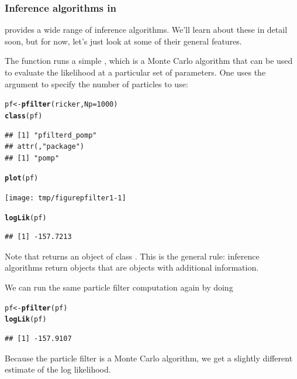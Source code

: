 \documentclass{beamer}\usepackage[]{graphicx}\usepackage[]{color}
\makeatletter
\newcommand{\hlnum}[1]{\textcolor[rgb]{0.686,0.059,0.569}{#1}}%
\newcommand{\hlstd}[1]{\textcolor[rgb]{0.345,0.345,0.345}{#1}}%
\newcommand{\hlkwb}[1]{\textcolor[rgb]{0.69,0.353,0.396}{#1}}%
\newcommand{\hlkwc}[1]{\textcolor[rgb]{0.333,0.667,0.333}{#1}}%
\newcommand{\hlkwd}[1]{\textcolor[rgb]{0.737,0.353,0.396}{\textbf{#1}}}%
\newenvironment{kframe}{%
 \def\at@end@of@kframe{}%
 \ifinner\ifhmode%
  \def\at@end@of@kframe{\end{minipage}}%
  \begin{minipage}{\columnwidth}%
 \fi\fi%
 \def\FrameCommand##1{\hskip\@totalleftmargin \hskip-\fboxsep
 \colorbox{shadecolor}{##1}\hskip-\fboxsep
     \hskip-\linewidth \hskip-\@totalleftmargin \hskip\columnwidth}%
 \MakeFramed {\advance\hsize-\width
   \@totalleftmargin\z@ \linewidth\hsize
   \@setminipage}}%
 {\par\unskip\endMakeFramed%
 \at@end@of@kframe}
\newenvironment{knitrout}{}{} %
\makeatother
\begin{document}
\begin{frame}[fragile] 

\frametitle{Inference algorithms in }

\bi
\item {} provides a wide range of inference algorithms.
We'll learn about these in detail soon, but for now, let's just look at some of their general features.

\item The  function runs a simple , which is a Monte Carlo algorithm that can be used to evaluate the likelihood at a particular set of parameters.
One uses the  argument to specify the number of particles to use:
\ei
\begin{knitrout}\small
{}\color{fgcolor}\begin{kframe}
\begin{alltt}
\hlstd{pf} \hlkwb{<-} \hlkwd{pfilter}\hlstd{(ricker,}\hlkwc{Np}\hlstd{=}\hlnum{1000}\hlstd{)}
\hlkwd{class}\hlstd{(pf)}
\end{alltt}
\begin{verbatim}
## [1] "pfilterd_pomp"
## attr(,"package")
## [1] "pomp"
\end{verbatim}
\begin{alltt}
\hlkwd{plot}\hlstd{(pf)}
\end{alltt}
\end{kframe}

{\centering \texttt{[image: tmp/figurepfilter1-1]} 

}


\begin{kframe}\begin{alltt}
\hlkwd{logLik}\hlstd{(pf)}
\end{alltt}
\begin{verbatim}
## [1] -157.7213
\end{verbatim}
\end{kframe}
\end{knitrout}
\bi
\item Note that  returns an object of class .
This is the general rule: inference algorithms return objects that are  objects with additional information.

\item We can run the same particle filter computation again by doing
\ei
\begin{knitrout}\small
{}\color{fgcolor}\begin{kframe}
\begin{alltt}
\hlstd{pf} \hlkwb{<-} \hlkwd{pfilter}\hlstd{(pf)}
\hlkwd{logLik}\hlstd{(pf)}
\end{alltt}
\begin{verbatim}
## [1] -157.9107
\end{verbatim}
\end{kframe}
\end{knitrout}
\bi
\item Because the particle filter is a Monte Carlo algorithm, we get a slightly different estimate of the log likelihood.


\end{frame}
\end{document}
